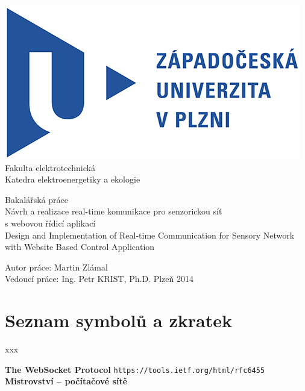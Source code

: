 \documentclass[oneside,12pt,a4paper]{book} %
\begin{document}
\pagestyle{empty}
\begin{titlepage}
\noindent
\includegraphics[scale=1]{zcu.png} \\[0.3cm]
Fakulta elektrotechnická \\
Katedra elektroenergetiky a ekologie
\vspace{5cm}
\begin{center}
	{\Huge\sc Bakalářská práce} \\
	\vspace{1cm}
	{\large Návrh a realizace real-time komunikace pro senzorickou síť\\s webovou řídicí aplikací\\}
	\vspace{1cm}
	{\large Design and Implementation of Real-time Communication for Sensory Network with Website Based Control Application}
\end{center}
\vfill
Autor práce: Martin Zlámal\\
Vedoucí práce: Ing. Petr KRIST, Ph.D. \hfill Plzeň 2014
\end{titlepage}

%



%
\tableofcontents
\cleardoublepage
\chapter*{Seznam symbolů a zkratek}
xxx








\begin{thebibliography}{9}
 {\bf The WebSocket Protocol} \texttt{https://tools.ietf.org/html/rfc6455}
 {\bf Mistrovství – počítačové sítě}
\end{thebibliography}
\end{document}
